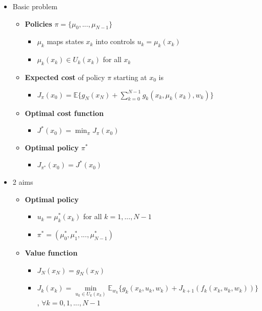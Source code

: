 \begin{itemize}
\begin{itemize}
        \end{itemize}
    \item Basic problem
        \begin{itemize}
            \item \textbf{Policies} $\pi=\{\mu_0,...,\mu_{N-1}\}$
                \begin{itemize}
                    \item $\mu_k$ maps states $x_k$ into controls $u_k=\mu_k(x_k)$
                    \item $\mu_k(x_k)\in U_k(x_k)$ for all $x_k$
                \end{itemize}
            \item \textbf{Expected cost} of policy $\pi$ starting at $x_0$ is
                \begin{itemize}
                    \item $J_{\pi}(x_0)=\mathbb{E}\{g_N(x_N)+\sum_{k=0}^{N-1}g_k(x_k,\mu_k(x_k),w_k)\}$
                \end{itemize}
            \item \textbf{Optimal cost function}
                \begin{itemize}
                    \item $J^*(x_0)=\min_{\pi}J_\pi(x_0)$
                \end{itemize}
            \item \textbf{Optimal policy} $\pi^*$
                \begin{itemize}
                    \item $J_{\pi^*}(x_0)=J^*(x_0)$
                \end{itemize}
        \end{itemize}
    \item 2 aims
        \begin{itemize}
            \item \textbf{Optimal policy} 
                \begin{itemize}
                    \item $u_k=\mu_k^*(x_k)$ for all $k=1,...,N-1$
                    \item $\pi^*=(\mu_0^*,\mu_1^*,...,\mu_{N-1}^*)$
                \end{itemize}
            \item \textbf{Value function}
            \begin{itemize}
                \item $J_N(x_N)=g_N(x_N)$
                \item $J_k(x_k)= \underset{u_k\in U_k(x_k)}{\min} \mathbb{E}_{w_k}\{g_k(x_k,u_k,w_k)+J_{k+1}(f_k(x_k,u_k,w_k))\}$, $\forall k=0,1,...,N-1$ \\
            \end{itemize}
        \end{itemize}
\end{itemize}

